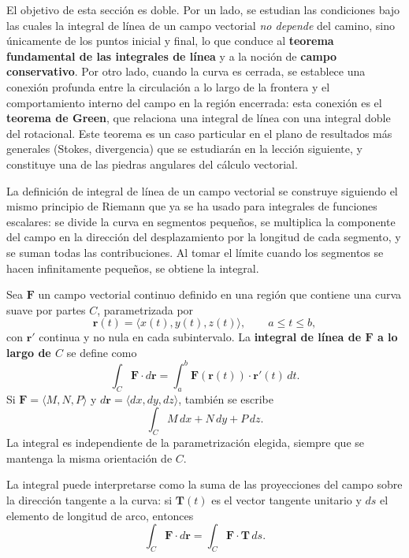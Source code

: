 El objetivo de esta sección es doble. Por un lado, se estudian las
condiciones bajo las cuales la integral de línea de un campo vectorial
\emph{no depende} del camino, sino únicamente de los puntos inicial y
final, lo que conduce al \textbf{teorema fundamental de las integrales
de línea} y a la noción de \textbf{campo conservativo}. Por otro lado,
cuando la curva es cerrada, se establece una conexión profunda entre la
circulación a lo largo de la frontera y el comportamiento interno del
campo en la región encerrada: esta conexión es el \textbf{teorema de
Green}, que relaciona una integral de línea con una integral doble del
rotacional. Este teorema es un caso particular en el plano de resultados
más generales (Stokes, divergencia) que se estudiarán en la lección
siguiente, y constituye una de las piedras angulares del cálculo
vectorial.


La definición de integral de línea de un campo vectorial se construye
siguiendo el mismo principio de Riemann que ya se ha usado para
integrales de funciones escalares: se divide la curva en segmentos
pequeños, se multiplica la componente del campo en la dirección del
desplazamiento por la longitud de cada segmento, y se suman todas las
contribuciones. Al tomar el límite cuando los segmentos se hacen
infinitamente pequeños, se obtiene la integral.

\begin{definition}
Sea $\mathbf{F}$ un campo vectorial continuo definido en una región que
contiene una curva suave por partes $C$, parametrizada por
\[
\mathbf{r}(t) = \langle x(t), y(t), z(t) \rangle, \qquad a \le t \le b,
\]
con $\mathbf{r}'$ continua y no nula en cada subintervalo. La
\textbf{integral de línea de $\mathbf{F}$ a lo largo de $C$} se define
como
\[
\int_C \mathbf{F} \cdot d\mathbf{r}
= \int_a^b \mathbf{F}(\mathbf{r}(t)) \cdot \mathbf{r}'(t) \, dt.
\]
Si $\mathbf{F} = \langle M, N, P \rangle$ y $d\mathbf{r} = \langle dx,
dy, dz \rangle$, también se escribe
\[
\int_C M\,dx + N\,dy + P\,dz.
\]
La integral es independiente de la parametrización elegida, siempre que
se mantenga la misma orientación de $C$.
\end{definition}

La integral puede interpretarse como la suma de las proyecciones del
campo sobre la dirección tangente a la curva: si $\mathbf{T}(t)$ es el
vector tangente unitario y $ds$ el elemento de longitud de arco,
entonces
\[
\int_C \mathbf{F} \cdot d\mathbf{r}
= \int_C \mathbf{F} \cdot \mathbf{T} \, ds.
\]


